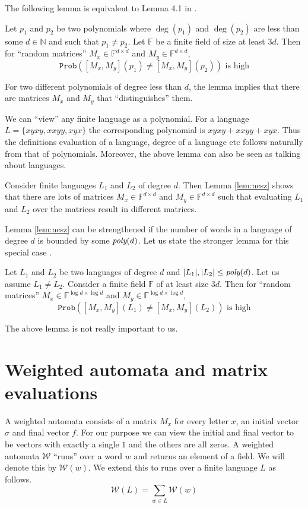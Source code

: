 \documentclass[english,course]{lecture}
\newcommand{\Mxy}[1]{[M_x,M_y](#1)}
\newcommand{\degree}[1]{\deg(#1)}
\newcommand{\field}{\mathbb{F}}
\newcommand{\poly}[1]{\emph{poly}(#1)}
\newcommand{\Prob}[1]{\ensuremath{\mathtt{Prob}(#1)}}
\newcommand{\wa}[1]{\mathcal{W}#1}
\begin{document}
The following lemma is equivalent to Lemma 4.1 in \cite{bw}.
\begin{lemma}
\label{lem:ncsz}
Let $p_1$ and $p_2$ be two polynomials where $\degree {p_1}$ and $\degree {p_2}$ are less than some $d\in\mathbb{N}$ and such that $p_1 \neq p_2$. Let $\field$ be a finite field of size at least $3d$. Then for ``random matrices'' $M_x \in \field^{d \times d}$ and $M_y \in \field^{d \times d}$, 
\[
\Prob{\Mxy {p_1} \neq \Mxy {p_2}} \text{ is high}
\]
\end{lemma}

For two different polynomials of degree less than $d$, the lemma implies that there are matrices $M_x$ and $M_y$ that ``distinguishes'' them. 

We can ``view'' any finite language as a polynomial. For a language $L = \{xyxy, xxyy, xyx\}$ the corresponding polynomial is $xyxy + xxyy + xyx$. Thus the definitions evaluation of a language, degree of a language etc follows naturally from that of polynomials. Moreover, the above lemma can also be seen as talking about languages.

Consider finite languages $L_1$ and $L_2$ of degree $d$. Then Lemma \ref{lem:ncsz} shows that there are lots of matrices $M_x \in \field^{d \times d}$ and $M_y \in \field^{d \times d}$ such that evaluating $L_1$ and $L_2$ over the matrices result in different matrices.

Lemma \ref{lem:ncsz} can be strengthened if the number of words in a language of degree $d$ is bounded by some $\poly d$. Let us state the stronger lemma for this special case \cite{arvind}.

\begin{lemma}
\label{lem:strongncsz}
Let $L_1$ and $L_2$ be two languages of degree $d$ and $|L_1|, |L_2| \leq \poly d$. Let us assume $L_1 \neq L_2$. Consider a finite field $\field$ of at least size $3d$. Then for ``random matrices'' $M_x \in \field^{\log d \times \log d}$ and $M_y \in \field^{\log d \times \log d}$, 
\[
\Prob{\Mxy {L_1} \neq \Mxy {L_2}} \text{ is high}
\]
\end{lemma}
The above lemma is not really important to us. 

\section{Weighted automata and matrix evaluations}
A weighted automata consists of a matrix $M_x$ for every letter $x$, an initial vector $\sigma$ and final vector $f$. For our purpose we can view the initial and final vector to be vectors with exactly a single $1$ and the others are all zeros. A weighted automata $\wa {}$ ``runs'' over a word $w$ and returns an element of a field. We will denote this by $\wa{(w)}$. We extend this to runs over a finite language $L$ as follows.
\[
\wa{(L)} = \sum_{w \in L} \wa{(w)}
\]
\end{document}
